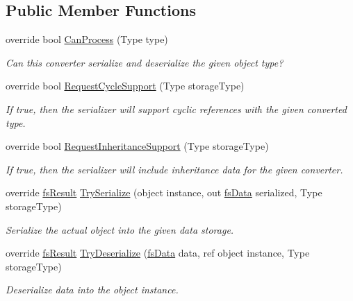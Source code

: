 \subsection*{Public Member Functions}
\begin{DoxyCompactItemize}
\item 
override bool \hyperlink{class_full_serializer_1_1_internal_1_1fs_guid_converter_af5e30658913957e51c7caa51622c2627}{Can\+Process} (Type type)
\begin{DoxyCompactList}\small\item\em Can this converter serialize and deserialize the given object type? \end{DoxyCompactList}\item 
override bool \hyperlink{class_full_serializer_1_1_internal_1_1fs_guid_converter_aaeaf4b6d5206b2b70f0d9d2d79a5efe7}{Request\+Cycle\+Support} (Type storage\+Type)
\begin{DoxyCompactList}\small\item\em If true, then the serializer will support cyclic references with the given converted type. \end{DoxyCompactList}\item 
override bool \hyperlink{class_full_serializer_1_1_internal_1_1fs_guid_converter_a4556062bfaec5d51b7c1120bf1388a4c}{Request\+Inheritance\+Support} (Type storage\+Type)
\begin{DoxyCompactList}\small\item\em If true, then the serializer will include inheritance data for the given converter. \end{DoxyCompactList}\item 
override \hyperlink{struct_full_serializer_1_1fs_result}{fs\+Result} \hyperlink{class_full_serializer_1_1_internal_1_1fs_guid_converter_a82f96f76d4b66fdb39edab0721416df7}{Try\+Serialize} (object instance, out \hyperlink{class_full_serializer_1_1fs_data}{fs\+Data} serialized, Type storage\+Type)
\begin{DoxyCompactList}\small\item\em Serialize the actual object into the given data storage. \end{DoxyCompactList}\item 
override \hyperlink{struct_full_serializer_1_1fs_result}{fs\+Result} \hyperlink{class_full_serializer_1_1_internal_1_1fs_guid_converter_aea7e0849acaab5508aa34246f2702832}{Try\+Deserialize} (\hyperlink{class_full_serializer_1_1fs_data}{fs\+Data} data, ref object instance, Type storage\+Type)
\begin{DoxyCompactList}\small\item\em Deserialize data into the object instance. \end{DoxyCompactList}\item 

\end{DoxyCompactItemize}
